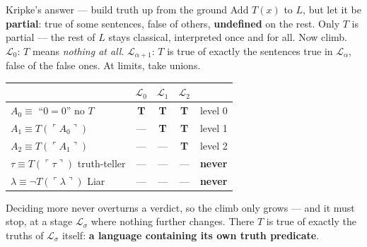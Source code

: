\documentclass[aspectratio=169,11pt]{beamer}
\newcommand{\key}[1]{{\color{accent}\textbf{#1}}}
\newcommand{\bad}[1]{{\color{warn}\textbf{#1}}}
\newcommand{\amber}[1]{{\color{gap}\textbf{#1}}}
\begin{document}
\begin{frame}{Kripke's answer --- build truth up from the ground}
  Add $T(x)$ to $L$, but let it be \key{partial}: true of some sentences, false of
  others, \key{undefined} on the rest. Only $T$ is partial --- the rest of $L$ stays
  classical, interpreted once and for all.
  \vfill
  \pause
  Now climb. \;\; $\mathcal{L}_0$: $T$ means \emph{nothing at all}. \;\;
  $\mathcal{L}_{\alpha+1}$: $T$ is true of exactly the sentences true in
  $\mathcal{L}_\alpha$, false of the false ones. \;\; At limits, take unions.
  \vfill
  \begin{center}\footnotesize
  \begin{tabular}{@{}lcccl@{}}
    \toprule
    & $\mathcal{L}_0$ & $\mathcal{L}_1$ & $\mathcal{L}_2$ & \\
    \midrule
    $A_0 \equiv$ ``$0=0$'' {\scriptsize no $T$}
                                           & \key{T} & \key{T} & \key{T} & level 0 \\
    $A_1 \equiv T(\ulcorner A_0\urcorner)$ & ---     & \key{T} & \key{T} & level 1 \\
    $A_2 \equiv T(\ulcorner A_1\urcorner)$ & ---     & ---     & \key{T} & level 2 \\
    $\tau \equiv T(\ulcorner \tau\urcorner)$ {\scriptsize truth-teller}
                                           & ---     & ---     & ---     & \amber{never} \\
    $\lambda \equiv \neg T(\ulcorner \lambda\urcorner)$ {\scriptsize Liar}
                                           & ---     & ---     & ---     & \bad{never} \\
    \bottomrule
  \end{tabular}
  \end{center}
  \vfill
  \pause
  Deciding more never overturns a verdict, so the climb only grows --- and it must
  stop, at a stage $\mathcal{L}_\sigma$ where nothing further changes. There $T$ is
  true of exactly the truths of $\mathcal{L}_\sigma$ itself:
  \key{a language containing its own truth predicate}.
\end{frame}
\end{document}
